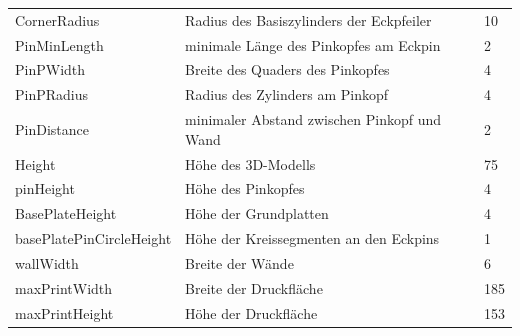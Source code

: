 \begin{tabularx}{\textwidth}{|X|X|Z|}
	\hline
	 &  &  \\ 
	\hline
	CornerRadius & Radius des Basiszylinders der Eckpfeiler & 10 \\ 
	\hline 
	PinMinLength & minimale Länge des Pinkopfes am Eckpin & 2 \\ 
	\hline 
	PinPWidth & Breite des Quaders des Pinkopfes & 4 \\ 
	\hline 
	PinPRadius & Radius des Zylinders am Pinkopf & 4 \\ 
	\hline 
	PinDistance & minimaler Abstand zwischen Pinkopf und Wand & 2 \\ 
	\hline 
	Height & Höhe des 3D-Modells & 75 \\ 
	\hline 
	pinHeight & Höhe des Pinkopfes & 4 \\ 
	\hline 
	BasePlateHeight & Höhe der Grundplatten & 4 \\ 
	\hline 
	\hspace{0pt}
	basePlatePinCircleHeight & Höhe der Kreissegmenten an den Eckpins & 1 \\ 
	\hline 
	wallWidth & Breite der Wände & 6 \\ 
	\hline 
	maxPrintWidth & Breite der Druckfläche & 185 \\ 
	\hline 
	maxPrintHeight & Höhe der Druckfläche & 153 \\  
	\hline
\end{tabularx}

